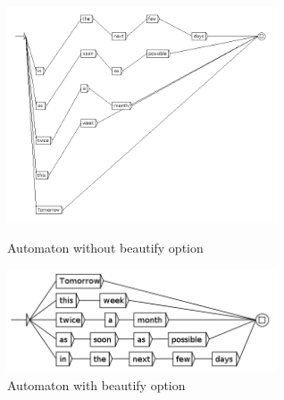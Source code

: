 \begin{figure}[h!]
	\begin{minipage}[h!]{0.5\linewidth}
		\centering
		\includegraphics[width=8cm]{resources/img/fig8-5GRFnoBeautify.png}	
		\caption{Automaton without beautify option\label{fig8-5GRFnoBeautify}}
	\end{minipage}
	\hspace{0.1cm}
	\begin{minipage}[h!]{0.5\linewidth}
		\centering
		\includegraphics[width=8cm]{resources/img/fig8-6GRFBeautify.png}
		\caption{Automaton with beautify option\label{fig8-6GRFBeautify}}
	\end{minipage}
	\hspace{0.1cm}
\end{figure}
\pagebreak
